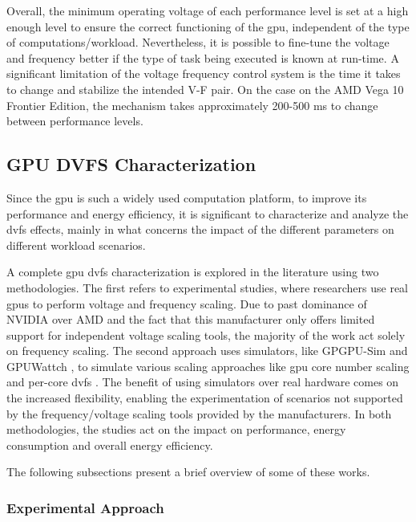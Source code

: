 Overall, the minimum operating voltage of each performance level is set at a high enough level to ensure the correct functioning of the \acrshort{gpu}, independent of the type of computations/workload. Nevertheless, it is possible to fine-tune the voltage and frequency better if the type of task being executed is known at run-time. A significant limitation of the voltage frequency control system is the time it takes to change and stabilize the intended V-F pair. On the case on the AMD Vega 10 Frontier Edition, the mechanism takes approximately 200-500 ms to change between performance levels.

\subsection{GPU DVFS Characterization}

Since the \acrshort{gpu} is such a widely used computation platform, to improve its performance and energy efficiency, it is significant to characterize and analyze the \acrshort{dvfs} effects, mainly in what concerns the impact of the different parameters on different workload scenarios. 

A complete \acrshort{gpu} \acrshort{dvfs} characterization is explored in the literature using two methodologies. The first refers to experimental studies, where researchers use real \acrshort{gpu}s to perform voltage and frequency scaling. Due to past dominance of NVIDIA over AMD \cite{noauthor_jon_2018, mujtaba_amd_2019} and the fact that this manufacturer only offers limited support for independent voltage scaling tools, the majority of the work act solely on frequency scaling. The second approach uses simulators, like GPGPU-Sim \cite{noauthor_gpgpu-sim/gpgpu-sim_distribution_2019} and GPUWattch \cite{noauthor_gpu_2011, leng_gpuwattch:_2013},  to simulate various scaling approaches like \acrshort{gpu} core number scaling and per-core \acrshort{dvfs} \cite{mei_survey_2016}. The benefit of using simulators over real hardware comes on the increased flexibility, enabling the experimentation of scenarios not supported by the frequency/voltage scaling tools provided by the manufacturers. In both methodologies, the studies act on the impact on performance, energy consumption and overall energy efficiency.

The following subsections present a brief overview of some of these works.


\subsubsection{Experimental Approach}

